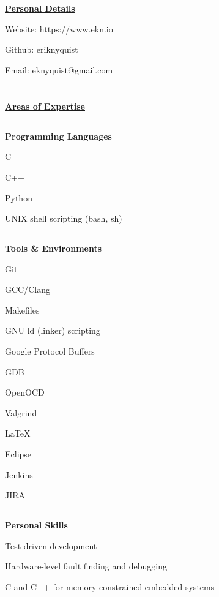 \documentclass[6pt]{article}
\begin{document}
%
%
\hspace*{-\parindent}%
\begin{minipage}{15em}
\section*{}
{\underline{\textbf{Personal Details}}}
\break

{\small Website: https://www.ekn.io

Github: eriknyquist

Email: eknyquist@gmail.com}

\section*{}
{\underline{\textbf{Areas of Expertise}}}
\subsection*{}
{\textbf{Programming Languages}}

{\small C

C++

Python

UNIX shell scripting (bash, sh)}

\subsection*{}
{\textbf{Tools \& Environments}}

{\small Git

GCC/Clang

Makefiles

GNU ld (linker) scripting

Google Protocol Buffers

GDB

OpenOCD

Valgrind

LaTeX

Eclipse

Jenkins

JIRA}

\subsection*{}
{\textbf{Personal Skills}}

\noindent
\begin{itemize}
{\small \raggedright
    \item Test-driven development
    \item Hardware-level fault finding and debugging
    \item C and C++ for memory constrained embedded systems
}
\end{itemize}


\end{minipage}
\end{document}
